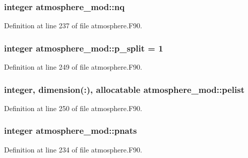 \subsubsection[{nq}]{\setlength{\rightskip}{0pt plus 5cm}integer atmosphere\-\_\-mod\-::nq\hspace{0.3cm}{\ttfamily [private]}}\label{classatmosphere__mod_ab5e69a4d3670d2800a288b1c49ad3d9a}


Definition at line 237 of file atmosphere.\-F90.

\subsubsection[{p\-\_\-split}]{\setlength{\rightskip}{0pt plus 5cm}integer atmosphere\-\_\-mod\-::p\-\_\-split = 1\hspace{0.3cm}{\ttfamily [private]}}\label{classatmosphere__mod_a95ee36e402cdda22fbff7a5e5a698d2d}


Definition at line 249 of file atmosphere.\-F90.

\subsubsection[{pelist}]{\setlength{\rightskip}{0pt plus 5cm}integer, dimension(\-:), allocatable atmosphere\-\_\-mod\-::pelist\hspace{0.3cm}{\ttfamily [private]}}\label{classatmosphere__mod_a40b6e75a5e8c4bafc747edc08eceaed5}


Definition at line 250 of file atmosphere.\-F90.

\subsubsection[{pnats}]{\setlength{\rightskip}{0pt plus 5cm}integer atmosphere\-\_\-mod\-::pnats\hspace{0.3cm}{\ttfamily [private]}}\label{classatmosphere__mod_a3ae095d62282ac16560419aa858cbd5b}


Definition at line 234 of file atmosphere.\-F90.

